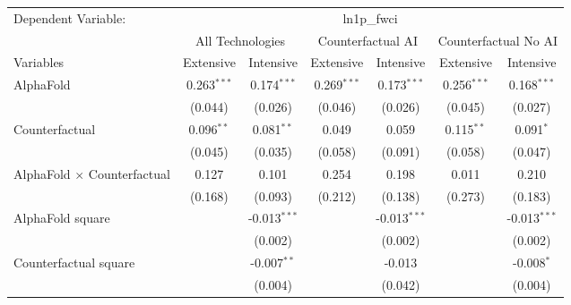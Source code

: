 \begingroup
\centering
\begin{tabular}{lcccccc}
   \tabularnewline \midrule \midrule
   Dependent Variable: & \multicolumn{6}{c}{ln1p\_fwci}\\
 & \multicolumn{2}{c}{All Technologies} & \multicolumn{2}{c}{Counterfactual AI} & \multicolumn{2}{c}{Counterfactual No AI} \\
\cmidrule(lr){1-1}\cmidrule(lr){2-3} \cmidrule(lr){4-5} \cmidrule(lr){6-7}
Variables & \multicolumn{1}{c}{Extensive} & \multicolumn{1}{c}{Intensive} & \multicolumn{1}{c}{Extensive} & \multicolumn{1}{c}{Intensive} & \multicolumn{1}{c}{Extensive} & \multicolumn{1}{c}{Intensive} \\
\cmidrule(lr){1-1}\cmidrule(lr){2-2} \cmidrule(lr){3-3} \cmidrule(lr){4-4} \cmidrule(lr){5-5} \cmidrule(lr){6-6} \cmidrule(lr){7-7}
   AlphaFold                          & 0.263$^{***}$ & 0.174$^{***}$  & 0.269$^{***}$ & 0.173$^{***}$  & 0.256$^{***}$ & 0.168$^{***}$\\   
                                      & (0.044)       & (0.026)        & (0.046)       & (0.026)        & (0.045)       & (0.027)\\   
   Counterfactual                     & 0.096$^{**}$  & 0.081$^{**}$   & 0.049         & 0.059          & 0.115$^{**}$  & 0.091$^{*}$\\   
                                      & (0.045)       & (0.035)        & (0.058)       & (0.091)        & (0.058)       & (0.047)\\   
   AlphaFold $\times$ Counterfactual  & 0.127         & 0.101          & 0.254         & 0.198          & 0.011         & 0.210\\   
                                      & (0.168)       & (0.093)        & (0.212)       & (0.138)        & (0.273)       & (0.183)\\   
   AlphaFold square                   &               & -0.013$^{***}$ &               & -0.013$^{***}$ &               & -0.013$^{***}$\\   
                                      &               & (0.002)        &               & (0.002)        &               & (0.002)\\   
   Counterfactual square              &               & -0.007$^{**}$  &               & -0.013         &               & -0.008$^{*}$\\   
                                      &               & (0.004)        &               & (0.042)        &               & (0.004)\\   

\end{tabular}
